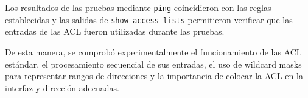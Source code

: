 \documentclass[12pt]{article}
\begin{document}
Los resultados de las pruebas mediante \texttt{ping} coincidieron con las
reglas establecidas y las salidas de \texttt{show access-lists} permitieron
verificar que las entradas de las ACL fueron utilizadas durante las pruebas.

De esta manera, se comprobó experimentalmente el funcionamiento de las ACL
estándar, el procesamiento secuencial de sus entradas, el uso de wildcard
masks para representar rangos de direcciones y la importancia de colocar la
ACL en la interfaz y dirección adecuadas.
\end{document}
